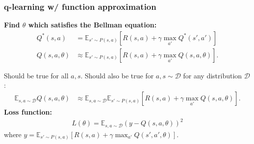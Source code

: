 \documentclass[handout,compress]{beamer}
\newcommand{\E}{\mathbb{E}}
\begin{document}
\begin{frame}
	\frametitle{q-learning w/ function approximation}
	\textbf{Find $\theta$ which satisfies the Bellman equation:}
	\begin{align*}
	Q^*(s,a) &= \E_{s' \sim P(s,a)} \left[R(s,a) + \gamma \max_{a'}Q^*(s',a')\right]\\
	Q(s,a,\theta) &\approx \E_{s' \sim P(s,a)} \left[R(s,a) + \gamma \max_{a'}Q(s,a,\theta)\right].
	\end{align*} 
	
	Should be true for all $a,s$. Should also be true for $a,s \sim \mathcal{D}$ for any distribution $\mathcal{D}$:
	\begin{align*}
		\E_{s,a \sim \mathcal{D}} Q(s,a,\theta) &\approx \E_{s,a \sim \mathcal{D}}\E_{s' \sim P(s,a)} \left[R(s,a) + \gamma \max_{a'}Q(s,a,\theta)\right].
	\end{align*}
	\textbf{Loss function:}
	\begin{align*}
	L(\theta) = \E_{s,a \sim \mathcal{D}}\left(y - Q(s,a,\theta)\right)^2  
	\end{align*}
	where $y = 	\E_{s' \sim P(s,a)} \left[R(s,a) + \gamma \max_{a'}Q(s',a', \theta)\right]$. 
\end{frame}
\end{document}

